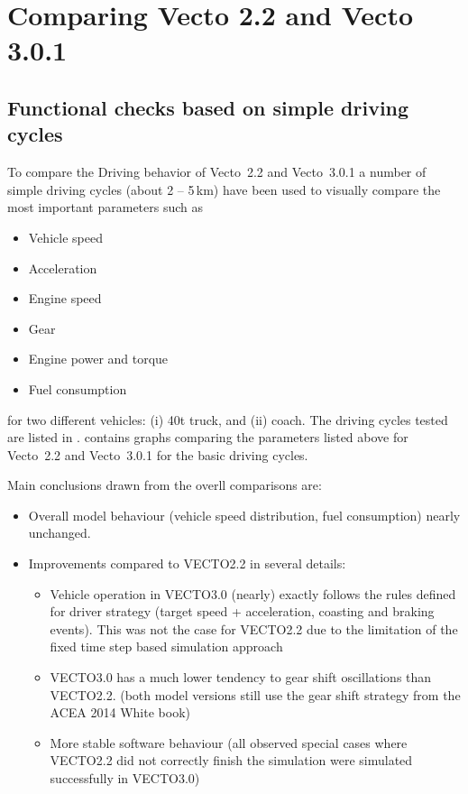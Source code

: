 
\section{Comparing Vecto 2.2 and Vecto 3.0.1} %
\label{sec:comparison_of_vecto_2_2_and_vecto_3_0_1}

\subsection{Functional checks based on simple driving cycles} %
\label{sub:functional_checks_based_on_simple_driving_cycles}

To compare the Driving behavior of Vecto~2.2 and Vecto~3.0.1 a number of simple driving cycles (about 2 -- 5\,km) have been used to visually compare the most important parameters such as 
\begin{itemize}
	\item Vehicle speed
	\item Acceleration
	\item Engine speed
	\item Gear
	\item Engine power and torque
	\item Fuel consumption
\end{itemize}
for two different vehicles: (i) 40t truck, and (ii) coach. The driving cycles tested are listed in .  contains graphs comparing the parameters listed above for Vecto~2.2 and Vecto~3.0.1 for the basic driving cycles.

Main conclusions drawn from the overll comparisons are:
\begin{itemize}
	\item Overall model behaviour (vehicle speed distribution, fuel consumption) nearly unchanged.
	\item Improvements compared to VECTO2.2 in several details:
	\begin{itemize}
		\item Vehicle operation in VECTO3.0 (nearly) exactly follows the rules defined for driver strategy (target speed + acceleration, coasting and braking events). This was not the case for VECTO2.2 due to the limitation of the fixed time step based simulation approach
		\item VECTO3.0 has a much lower tendency to gear shift oscillations than VECTO2.2. (both model versions still use the gear shift strategy from the ACEA 2014 White book)
		\item More stable software behaviour (all observed special cases where VECTO2.2 did not correctly finish the simulation were simulated successfully in VECTO3.0)
	\end{itemize}
\end{itemize}

